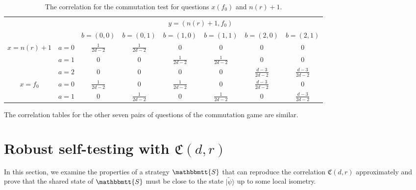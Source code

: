 \documentclass[11pt,letterpaper]{article}
\newcommand{\ket}[1]{|#1\rangle}
\newcommand{\1}{\mathbb{1}}
\newcommand{\tpsi}{\tilde{\psi}}
\newcommand{\nr}{n(r)}
\newcommand{\fC}{\mathfrak{C}}
\newcommand{\bS}{\mathbbmtt{S}}
\theoremstyle{definition}
\begin{document}
\begin{table}[H]
\begin{center}
\begin{tabular}{|c|c||c|c|c|c|c|c|}
\hline
\multicolumn{2}{|c|}{} &
\multicolumn{6}{|c|}{$y=(\nr+1, f_0)$}\\
\cline{3-8}
\multicolumn{2}{|c|}{} &
$b = (0,0)$ & $b=(0,1)$ & 
$b = (1,0)$ & $b=(1,1)$ &
$b = (2,0)$ & $b=(2,1)$   \\
\hline
\hline
\multirow{3}{*}{$x = \nr+1$} & $a=0$ & $\frac{1}{2d-2}$ & $\frac{1}{2d-2}$ &  $0$
& $0$ & $0$ & $0$  \\
\cline{2-8}
&$a=1$ & $0$ & $0 $ & $\frac{1}{2d-2}$ 
&  $\frac{1}{2d-2}$ & $0$ & $0$  \\
\cline{2-8}
&$a=2$ & 0 & 0 & $0$ 
&  0 & $\frac{d-3}{2d-2}$ & $\frac{d-3}{2d-2} $  \\
\hline
\multirow{2}{*}{$x = f_0$} & $a=0$ & $\frac{1}{2d-2}$ & $0$ & $\frac{1}{2d-2}$ 
& $0$ & $\frac{d-3}{2d-2}$ & 0  \\
\cline{2-8}
&$a=1$ & $0$ & $\frac{1}{2d-2}$ & $0$ 
&  $\frac{1}{2d-2}$ & $0$ & $\frac{d-3}{2d-2}$  \\
\hline
\end{tabular}
\end{center}
\caption{The correlation for the commutation test for questions $x(f_0)$ and $\nr+1$.}
\label{tbl:comm}
\end{table}
The correlation tables for the other seven pairs
of questions of the commutation game are similar.

\section{Robust self-testing with $\fC(d,r)$}
\label{sec:main}
In this section, we examine the properties of a strategy $\bS$ that can reproduce the
correlation $\fC(d,r)$ approximately and 
prove that the shared state of $\bS$ must be close to the state $\ket{\tpsi}$
up to some local isometry.
\end{document}
